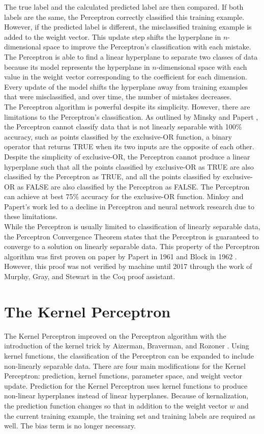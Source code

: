 The true label and the calculated predicted label are then compared. If both labels are the same, the Perceptron correctly classified this training example. However, if the predicted label is different, the misclassified training example is added to the weight vector. This update step shifts the hyperplane in $n$-dimensional space to improve the Perceptron's classification with each mistake. The Perceptron is able to find a linear hyperplane to separate two classes of data because its model represents the hyperplane in $n$-dimensional space with each value in the weight vector corresponding to the coefficient for each dimension. Every update of the model shifts the hyperplane away from training examples that were misclassified, and over time, the number of mistakes decreases.
\\The Perceptron algorithm is powerful despite its simplicity. However, there are limitations to the Perceptron's classification. As outlined by Minsky and Papert \cite{MP69}, the Perceptron cannot classify data that is not linearly separable with 100\% accuracy, such as points classified by the exclusive-OR function, a binary operator that returns TRUE when its two inputs are the opposite of each other. Despite the simplicity of exclusive-OR, the Perceptron cannot produce a linear hyperplane such that all the points classified by exclusive-OR as TRUE are also classified by the Perceptron as TRUE, and all the points classified by exclusive-OR as FALSE are also classified by the Perceptron as FALSE. The Perceptron can achieve at best 75\% accuracy for the exclusive-OR function. Minksy and Papert's work led to a decline in Perceptron and neural network research due to these limitations.
\\While the Perceptron is usually limited to classification of linearly separable data, the Perceptron Convergence Theorem states that the Perceptron is guaranteed to converge to a solution on linearly separable data. This property of the Perceptron algorithm was first proven on paper by Papert in 1961 \cite{Pap61} and Block in 1962 \cite{Blo62}. However, this proof was not verified by machine until 2017 through the work of Murphy, Gray, and Stewart \cite{MGS17} in the Coq proof assistant. 
\section{The Kernel Perceptron}\label{KernelPerceptronSection}
The Kernel Perceptron improved on the Perceptron algorithm with the introduction of the kernel trick by Aizerman, Braverman, and Rozoner \cite{ABR64}. Using kernel functions, the classification of the Perceptron can be expanded to include non-linearly separable data. There are four main modifications for the Kernel Perceptron: prediction, kernel functions, parameter space, and weight vector update. Prediction for the Kernel Perceptron uses kernel functions to produce non-linear hyperplanes instead of linear hyperplanes. Because of kernalization, the prediction function changes so that in addition to the weight vector $w$ and the current training example, the training set and training labels are required as well. The bias term is no longer necessary.

